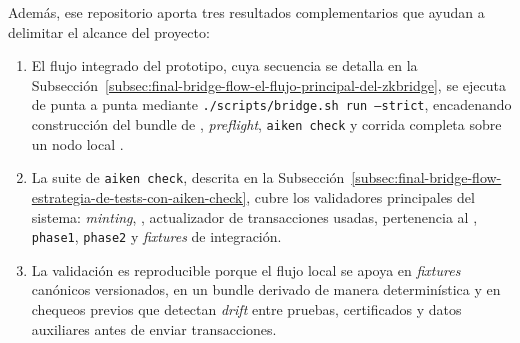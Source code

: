 Además, ese repositorio aporta tres resultados complementarios que ayudan a delimitar el alcance del proyecto:

\begin{enumerate}[noitemsep]
  \item El flujo integrado del prototipo, cuya secuencia se detalla en la Subsección~\ref{subsec:final-bridge-flow-el-flujo-principal-del-zkbridge}, se ejecuta de punta a punta mediante \texttt{./scripts/bridge.sh run --strict}, encadenando construcción del bundle de \Mithril, \textit{preflight}, \texttt{aiken check} y corrida completa sobre un nodo local \Dolos.
  \item La suite de \texttt{aiken check}, descrita en la Subsección~\ref{subsec:final-bridge-flow-estrategia-de-tests-con-aiken-check}, cubre los validadores principales del sistema: \textit{minting}, \StakeDistribution, actualizador de transacciones usadas, pertenencia al \Snapshot, \texttt{phase1}, \texttt{phase2} y \textit{fixtures} de integración.
  \item La validación es reproducible porque el flujo local se apoya en \textit{fixtures} canónicos versionados, en un bundle derivado de manera determinística y en chequeos previos que detectan \textit{drift} entre pruebas, certificados y datos auxiliares antes de enviar transacciones.
\end{enumerate}
